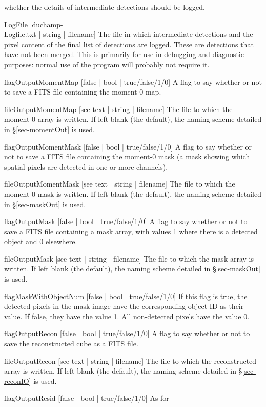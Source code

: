 \begin{Lentry}
  whether the details of intermediate detections should be logged.
\item[{LogFile [duchamp-\\Logfile.txt | string | filename]}] The file
  in which intermediate detections and the pixel content of the final
  list of detections are logged. These are detections that have not
  been merged. This is primarily for use in debugging and diagnostic
  purposes: normal use of the program will probably not require it.
\item[{flagOutputMomentMap [false | bool | true/false/1/0]}] A flag to
  say whether or not to save a FITS file containing the moment-0 map.
\item[fileOutputMomentMap{ [see text | string | filename]}] The file
  to which the moment-0 array is written. If left blank (the default),
  the naming scheme detailed in \S\ref{sec-momentOut} is used.
\item[{flagOutputMomentMask [false | bool | true/false/1/0]}] A flag
  to say whether or not to save a FITS file containing the moment-0
  mask (a mask showing which spatial pixels are detected in one or
  more channels).
\item[fileOutputMomentMask{ [see text | string | filename]}] The file
  to which the moment-0 mask is written. If left blank (the default),
  the naming scheme detailed in \S\ref{sec-maskOut} is used.
\item[{flagOutputMask [false | bool | true/false/1/0]}] A flag to say
  whether or not to save a FITS file containing a mask array, with
  values 1 where there is a detected object and 0 elsewhere.
\item[fileOutputMask{ [see text | string | filename]}] The file to
  which the mask array is written. If left blank (the default), the
  naming scheme detailed in \S\ref{sec-maskOut} is used.
\item[{flagMaskWithObjectNum [false | bool | true/false/1/0]}] If this
  flag is true, the detected pixels in the mask image have the
  corresponding object ID as their value. If false, they have the
  value 1. All non-detected pixels have the value 0.
\item[{flagOutputRecon [false | bool | true/false/1/0]}] A flag to say
  whether or not to save the reconstructed cube as a FITS file.
\item[fileOutputRecon{ [see text | string | filename]}] The file to
  which the reconstructed array is written. If left blank (the
  default), the naming scheme detailed in \S\ref{sec-reconIO} is used.
\item[{flagOutputResid [false | bool | true/false/1/0]}] As for

\end{Lentry}
